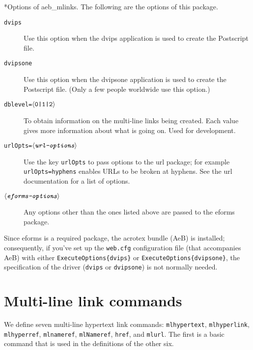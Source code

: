 \documentclass{article}
\makeatletter
\def\anglemeta#1{$\langle\textit{\texttt{#1}}\rangle$}
\let\ameta\anglemeta
\def\darg#1{\texttt{\{#1\}}}
\let\pkg\textsf
\let\opt\texttt
\let\app\textsf
\def\cs#1{\texttt{\@backslashchar#1}}
\renewcommand{\paragraph}
    {\@startsection{paragraph}{4}{0pt}{6pt}{-3pt}{\bfseries}}
\makeatother
\begin{document}
\paragraph*{Options of \pkg{aeb\_mlinks}.} The following are the options of this package.
\begin{description}
  \item[\normalfont\texttt{dvips}] Use this option when the \textsf{dvips} application is used
  to create the Postscript file.
  \item[\normalfont\texttt{dvipsone}] Use this option when the \textsf{dvipsone} application is used
  to create the Post\-script file. (Only a few people worldwide use this option.)
  \item[\normalfont\texttt{dblevel=\ameta{\upshape{0|1|2}}}] To obtain information on the multi-line links being
  created. Each value gives more information about what is going on. Used for development.
  \item[\normalfont\texttt{urlOpts=\ameta{url-options}}] Use the key \opt{urlOpts} to pass options to the
  \pkg{url} package; for example \opt{urlOpts=hyphens} enables URLs to be broken at hyphens. See the
  \pkg{url} documentation for a list of options.
  \item[\normalfont\ameta{eforms-options}] Any options other than the ones listed above are passed to the
  \pkg{eforms} package.
\end{description}
Since \pkg{eforms} is a required package, the \pkg{acrotex} bundle
(\pkg{AeB}) is installed; consequently, if you've set up the \texttt{web.cfg}
configuration file (that accompanies \pkg{AeB}) with either
\cs{ExecuteOptions\darg{dvips}} or \cs{ExecuteOptions\darg{dvipsone}}, the
specification of the driver (\opt{dvips} or \opt{dvipsone}) is not normally
needed.

\section{Multi-line link commands}

We define seven multi-line hypertext link commands: \cs{mlhypertext},
\cs{mlhyperlink}, \cs{mlhyperref}, \cs{mlnameref}, \cs{mlNameref},
\cs{href}, and \cs{mlurl}. The first is a basic command that is used in the definitions of
the other six.

\end{document}
